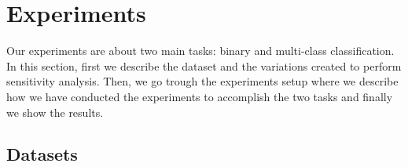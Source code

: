 \section{Experiments}
Our experiments are about two main tasks: binary and multi-class classification. In this section, first we describe the dataset and the variations created to perform sensitivity analysis. Then, we go trough the experiments setup where we describe how we have conducted the experiments to accomplish the two tasks and finally we show the results.
\subsection{Datasets}
\begin{figure}
	\begin{center}
\end{center}
\end{figure}
